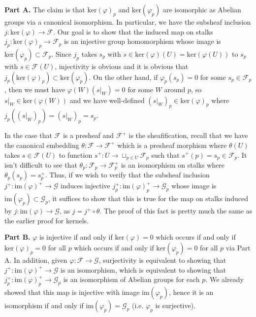 \documentclass[aps,pra,showpacs,notitlepage,onecolumn,superscriptaddress,nofootinbib]{revtex4-1}
\theoremstyle{definition}
\begin{document}
\noindent \textbf{Part A.} The claim is that $\text{ker}(\varphi)_p$ and $\text{ker}(\varphi_p)$ are isomorphic as Abelian groups via a canonical isomorphism.
In particular, we have the subsheaf inclusion $j : \text{ker}(\varphi) \to \mathcal{F}$. Our goal is to show that the induced map on stalks $j_p : \text{ker}(\varphi)_p \to \mathcal{F}_p$
is an injective group homomorphism whose image is $\text{ker}(\varphi_p) \subset \mathcal{F}_p$. Since $j_p$ takes $s_p$ with $s \in \text{ker}(\varphi)(U) = \text{ker}(\varphi(U))$ to
$s_p$ with $s \in \mathcal{F}(U)$, injectivity is obvious and it is obvious that $j_p(\text{ker}(\varphi)_p) \subset \text{ker}(\varphi_p)$. On the other hand, if $\varphi_p(s_p) = 0$
for some $s_p \in \mathcal{F}_p$, then we must have $\varphi(W)(s|_W) = 0$ for some $W$ around $p$, so $s|_W \in \text{ker}(\varphi(W))$ and we have well-defined $(s|_W)_p \in \text{ker}(\varphi)_p$ where $j_p((s|_W)_p) = (s|_W)_p = s_p$.

In the case that $\mathcal{F}$ is a presheaf and $\mathcal{F}^{+}$ is the sheafification, recall that we have the canonical embedding $\theta : \mathcal{F} \to \mathcal{F}^{+}$
which is a presheaf morphism where $\theta(U)$ takes $s \in \mathcal{F}(U)$ to function $s^{+} : U \to \sqcup_{p \in U} \mathcal{F}_p$ such that $s^{+}(p) = s_p \in \mathcal{F}_p$.
It isn't difficult to see that $\theta_p : \mathcal{F}_p \to \mathcal{F}^{+}_p$ is an isomorphism on stalks where $\theta_p(s_p) = s_p^{+}$. Thus, if we wish to verify that the
subsheaf inclusion $j^{+} : \text{im}(\varphi)^{+} \to \mathcal{G}$ induces injective $j^{+}_p : \text{im}(\varphi)^{+}_p \to \mathcal{G}_p$ whose image is $\text{im}(\varphi_p) \subset \mathcal{G}_p$,
it suffices to show that this is true for the map on stalks induced by $j : \text{im}(\varphi) \to \mathcal{G}$, as $j = j^{+} \circ \theta$. The proof of this fact
is pretty much the same as the earlier proof for kernels.
\newline

\noindent \textbf{Part B.} $\varphi$ is injective if and only if $\text{ker}(\varphi) = 0$ which occurs if and only if $\text{ker}(\varphi)_p = 0$ for all $p$ which occurs if and only
if $\text{ker}(\varphi_p) = 0$ for all $p$ via Part A. In addition, given $\varphi : \mathcal{F} \to \mathcal{G}$, surjectivity is equivalent to showing that $j^{+} : \text{im}(\varphi)^{+} \to \mathcal{G}$
is an isomorphism, which is equivalent to showing that $j^{+}_p : \text{im}(\varphi)^{+}_p \to \mathcal{G}_p$ is an isomorphism of Abelian groups for each $p$. We already showed that this map
is injective with image $\text{im}(\varphi_p)$, hence it is an isomorphism if and only if $\text{im}(\varphi_p) = \mathcal{G}_p$ (i.e. $\varphi_p$ is surjective).
\newline
\end{document}
